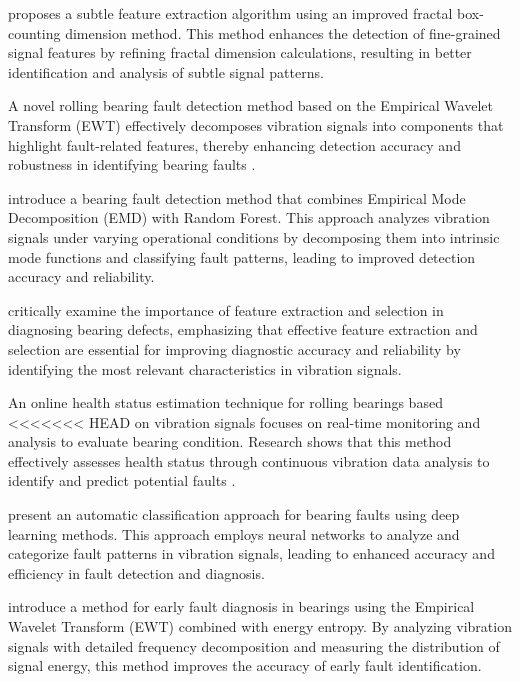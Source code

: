 \documentclass[sn-basic,pdflatex]{sn-jnl}
\theoremstyle{remark}
\theoremstyle{definition}
\begin{document}
\citet{WOS:000477760600061} proposes a subtle feature extraction
algorithm using an improved fractal box-counting dimension method. This
method enhances the detection of fine-grained signal features by
refining fractal dimension calculations, resulting in better
identification and analysis of subtle signal patterns.

A novel rolling bearing fault detection method based on the Empirical
Wavelet Transform (EWT) effectively decomposes vibration signals into
components that highlight fault-related features, thereby enhancing
detection accuracy and robustness in identifying bearing faults
\citep{WOS:000467079500501}.

\citet{WOS:000459864800144} introduce a bearing fault detection method
that combines Empirical Mode Decomposition (EMD) with Random Forest.
This approach analyzes vibration signals under varying operational
conditions by decomposing them into intrinsic mode functions and
classifying fault patterns, leading to improved detection accuracy and
reliability.

\citet{WOS:000458657500187} critically examine the importance of feature
extraction and selection in diagnosing bearing defects, emphasizing that
effective feature extraction and selection are essential for improving
diagnostic accuracy and reliability by identifying the most relevant
characteristics in vibration signals.

An online health status estimation technique for rolling bearings based
<<<<<<< HEAD
on vibration signals focuses on real-time monitoring and analysis to
evaluate bearing condition. Research shows that this method effectively
assesses health status through continuous vibration data analysis to
identify and predict potential faults \citep{WOS:000452922000015}.

\citet{WOS:000453413600001} present an automatic classification approach
for bearing faults using deep learning methods. This approach employs
neural networks to analyze and categorize fault patterns in vibration
signals, leading to enhanced accuracy and efficiency in fault detection
and diagnosis.

\citet{WOS:000452819600235} introduce a method for early fault diagnosis
in bearings using the Empirical Wavelet Transform (EWT) combined with
energy entropy. By analyzing vibration signals with detailed frequency
decomposition and measuring the distribution of signal energy, this
method improves the accuracy of early fault identification.
\end{document}
